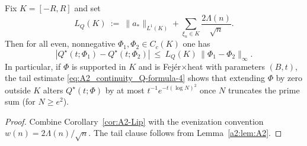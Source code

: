 \begin{corollary}\label{a2:cor:explicit-lip}
Fix $K=[-R,R]$ and set
\[
L_Q(K)\ :=\ \|a_*\|_{L^1(K)} + \sum_{\xi_n\in K} \frac{2\Lambda(n)}{\sqrt n}.
\]
Then for all even, nonnegative $\Phi_1,\Phi_2\in C_c(K)$ one has
\[
|Q^\star(t;\Phi_1)-Q^\star(t;\Phi_2)|\ \le\ L_Q(K)\,\|\Phi_1-\Phi_2\|_\infty.
\]
In particular, if $\Phi$ is supported in $K$ and is Fej\'er$\times$heat with parameters $(B,t)$, the tail estimate \eqref{eq:A2_continuity_Q-formula-4} shows that extending $\Phi$ by zero outside $K$ alters $Q^\star(t;\Phi)$ by at most $t^{-1}e^{-t(\log N)^2}$ once $N$ truncates the prime sum (for $N\ge e^2$).
\end{corollary}
\begin{proof}
Combine Corollary~\ref{cor:A2-Lip} with the evenization convention $w(n)=2\Lambda(n)/\sqrt n$. The tail clause follows from Lemma~\ref{a2:lem:A2}.
\end{proof}
